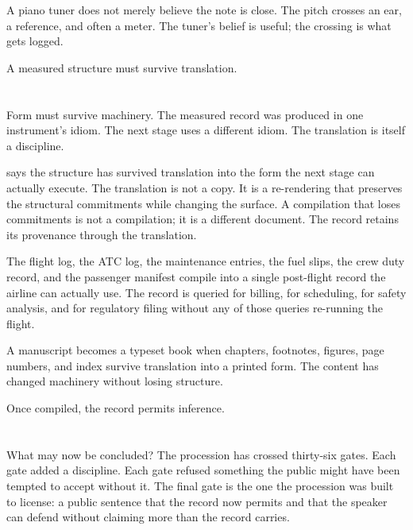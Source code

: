 A piano tuner does not merely believe the note is close. The pitch
crosses an ear, a reference, and often a meter. The tuner's belief is
useful; the crossing is what gets logged.

A measured structure must survive translation.

\section{}
\label{se:compiled}

Form must survive machinery. The measured record was produced in one
instrument's idiom. The next stage uses a different idiom. The
translation is itself a discipline.

 says the structure has survived translation into the
form the next stage can actually execute. The translation is not a
copy. It is a re-rendering that preserves the structural commitments
while changing the surface. A compilation that loses commitments is
not a compilation; it is a different document. The record retains its
provenance through the translation.

The flight log, the ATC log, the maintenance entries, the fuel slips,
the crew duty record, and the passenger manifest compile into a single
post-flight record the airline can actually use. The record is queried
for billing, for scheduling, for safety analysis, and for regulatory
filing without any of those queries re-running the flight.

A manuscript becomes a typeset book when chapters, footnotes, figures,
page numbers, and index survive translation into a printed form. The
content has changed machinery without losing structure.

Once compiled, the record permits inference.

\section{}
\label{se:inferred}

What may now be concluded? The procession has crossed thirty-six
gates. Each gate added a discipline. Each gate refused something the
public might have been tempted to accept without it. The final gate
is the one the procession was built to license: a public sentence
that the record now permits and that the speaker can defend without
claiming more than the record carries.

